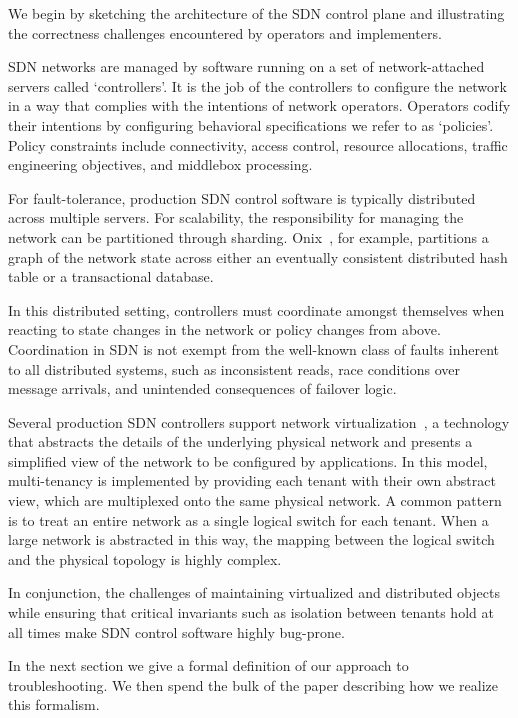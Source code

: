 We begin by sketching the architecture of the SDN control plane and
illustrating the correctness challenges encountered by operators and
implementers.

SDN networks are managed by software running on a set of network-attached
servers called `controllers'. It is the job of the controllers to configure
the network in a way that complies with the intentions of network
operators. Operators codify their intentions by configuring
behavioral specifications we refer to as `policies'. Policy constraints
include connectivity, access control,
resource allocations, traffic engineering objectives, and middlebox
processing.

For fault-tolerance, production SDN control software is typically
distributed across multiple servers. For scalability, the responsibility for
managing the network can be partitioned through sharding.
Onix~\cite{onix}, for example, partitions a
graph of the network state across either an eventually consistent
distributed hash table or a
transactional database.

In this distributed setting, controllers must coordinate amongst themselves
when reacting to state changes in the network or
policy changes from above.
Coordination in SDN is not exempt from the well-known class of faults
inherent to all distributed systems, such as
inconsistent reads, race conditions over message arrivals, and
unintended consequences of failover logic.

Several production SDN controllers support network
virtualization~\cite{bigswitch,nicirahomepage,contextream}, a technology that
abstracts the details of the underlying physical network and presents a
simplified view of the network to be configured by applications.
In this model, multi-tenancy is implemented by providing each tenant with their
own abstract view, which are multiplexed onto the same physical network.
A common pattern is to treat an entire network as a single logical switch for each
tenant. When a large network is
abstracted in this way, the mapping between
the logical switch and the physical topology is highly complex.

In conjunction, the challenges of maintaining virtualized and distributed
objects while ensuring that critical invariants such as isolation between
tenants hold at all times make
SDN control software highly bug-prone.

In the next section we give a formal definition of our approach to
troubleshooting. We then spend
the bulk of the paper describing how we realize this formalism.

